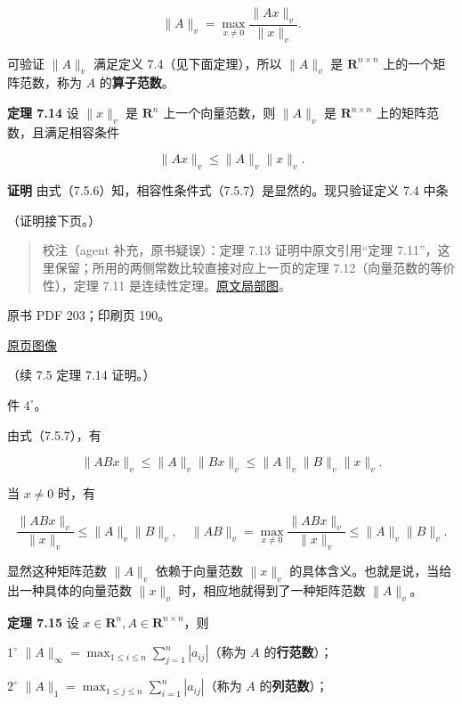\documentclass[
  10pt,
  fontset=fandol]{ctexart}
\begin{document}
\[
\|A\|_v=\max_{x\neq0}\frac{\|Ax\|_v}{\|x\|_v}.
\tag{7.5.6}
\]

可验证 \(\|A\|_v\) 满足定义 7.4（见下面定理），所以 \(\|A\|_v\) 是
\(\mathbf R^{n\times n}\) 上的一个矩阵范数，称为 \(A\)
的\textbf{算子范数}。

\textbf{定理 7.14} 设 \(\|x\|_v\) 是 \(\mathbf R^n\) 上一个向量范数，则
\(\|A\|_v\) 是 \(\mathbf R^{n\times n}\) 上的矩阵范数，且满足相容条件

\[
\|Ax\|_v\leqslant\|A\|_v\|x\|_v.
\tag{7.5.7}
\]

\textbf{证明}
由式（7.5.6）知，相容性条件式（7.5.7）是显然的。现只验证定义 7.4 中条

（证明接下页。）

\begin{quote}
校注（agent 补充，原书疑误）：定理 7.13 证明中原文引用``定理
7.11''，这里保留；所用的两侧常数比较直接对应上一页的定理
7.12（向量范数的等价性），定理 7.11
是连续性定理。\href{/Users/xiangjunfeng/Desktop/数值计算专用/numerical-analysis/book/staging/ch07b/assets/202-reference.png}{原文局部图}。
\end{quote}

\clearpage

原书 PDF 203；印刷页 190。

\href{/Users/xiangjunfeng/Desktop/数值计算专用/numerical-analysis/book/source-images/pdf-203.jpeg}{原页图像}

（续 7.5 定理 7.14 证明。）

件 \(4^\circ\)。

由式（7.5.7），有

\[
\|ABx\|_v\leqslant\|A\|_v\|Bx\|_v\leqslant\|A\|_v\|B\|_v\|x\|_v.
\]

当 \(x\neq0\) 时，有

\[
\frac{\|ABx\|_v}{\|x\|_v}\leqslant\|A\|_v\|B\|_v,\quad
\|AB\|_v=\max_{x\neq0}\frac{\|ABx\|_v}{\|x\|_v}\leqslant\|A\|_v\|B\|_v.
\]

显然这种矩阵范数 \(\|A\|_v\) 依赖于向量范数 \(\|x\|_v\)
的具体含义。也就是说，当给出一种具体的向量范数 \(\|x\|_v\)
时，相应地就得到了一种矩阵范数 \(\|A\|_v\)。

\textbf{定理 7.15} 设 \(x\in\mathbf R^n,A\in\mathbf R^{n\times n}\)，则

\(1^\circ\)
\(\|A\|_\infty=\max_{1\leqslant i\leqslant n}\sum_{j=1}^{n}|a_{ij}|\)（称为
\(A\) 的\textbf{行范数}）；

\(2^\circ\)
\(\|A\|_1=\max_{1\leqslant j\leqslant n}\sum_{i=1}^{n}|a_{ij}|\)（称为
\(A\) 的\textbf{列范数}）；
\end{document}
